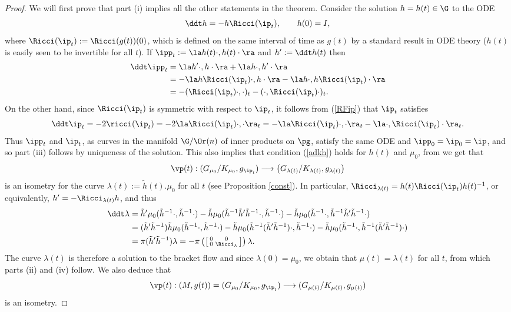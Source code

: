\documentclass[11pt]{amsart}
\theoremstyle{plain}
\theoremstyle{definition}
\theoremstyle{remark}
\begin{document}
\begin{proof}
We will first prove that part (i) implies all the other statements in the theorem.  Consider the solution $h=h(t)\in\G$ to the ODE
$$
\ddt h=-h\Ricci(\ip_t),\qquad h(0)=I,
$$
where $\Ricci(\ip_t):=\Ricci(g(t))(0)$, which is defined on the same interval of time as $g(t)$ by a standard result in ODE theory ($h(t)$ is easily seen to be invertible for all $t$).  If $\ipp_t:=\la h(t)\cdot,h(t)\cdot\ra$ and $h':=\ddt h(t)$ then
\begin{align}
\ddt\ipp_t &= \la h'\cdot,h\cdot\ra+\la h\cdot,h'\cdot\ra \notag\\
&= -\la h\Ricci(\ip_t)\cdot,h\cdot\ra -\la h\cdot,h\Ricci(\ip_t)\cdot\ra \label{ddtip}\\
&= -(\Ricci(\ip_t)\cdot,\cdot)_t -(\cdot,\Ricci(\ip_t)\cdot)_t. \notag
\end{align}
On the other hand, since $\Ricci(\ip_t)$ is symmetric with respect to $\ip_t$, it follows from (\ref{RFip}) that $\ip_t$ satisfies
$$
\ddt\ip_t=-2\ricci(\ip_t)=-2\la\Ricci(\ip_t)\cdot,\cdot\ra_t= -\la\Ricci(\ip_t)\cdot,\cdot\ra_t-\la\cdot,\Ricci(\ip_t)\cdot\ra_t.
$$
Thus $\ipp_t$ and $\ip_t$, as curves in the manifold $\G/\Or(n)$ of inner products on $\pg$, satisfy the same ODE and $\ipp_0=\ip_0=\ip$, and so part (iii) follows by uniqueness of the solution.  This also implies that condition (\ref{adkh}) holds for $h(t)$ and $\mu_0$, from we get that
$$
\vp(t):(G_{\mu_0}/K_{\mu_0},g_{\ip_t})\longrightarrow \left(G_{\lambda(t)}/K_{\lambda(t)},g_{\lambda(t)}\right)
$$
is an isometry for the curve $\lambda(t):=\tilde{h}(t).\mu_0$ for all $t$ (see Proposition \ref{const}).  In particular,  $\Ricci_{\lambda(t)}=h(t)\Ricci(\ip_t)h(t)^{-1}$, or equivalently, $h'=-\Ricci_{\lambda(t)}h$, and thus
\begin{align}
\ddt\lambda &= \tilde{h}'\mu_0(\tilde{h}^{-1}\cdot,\tilde{h}^{-1}\cdot) -\tilde{h}\mu_0(\tilde{h}^{-1}\tilde{h}'\tilde{h}^{-1}\cdot,\tilde{h}^{-1}\cdot) -\tilde{h}\mu_0(\tilde{h}^{-1}\cdot,\tilde{h}^{-1}\tilde{h}'\tilde{h}^{-1}\cdot) \notag\\
&= (\tilde{h}'\tilde{h}^{-1})\tilde{h}\mu_0(\tilde{h}^{-1}\cdot,\tilde{h}^{-1}\cdot)-\tilde{h}\mu_0(\tilde{h}^{-1}(\tilde{h}'\tilde{h}^{-1})\cdot,\tilde{h}^{-1}\cdot) -\tilde{h}\mu_0(\tilde{h}^{-1}\cdot,\tilde{h}^{-1}(\tilde{h}'\tilde{h}^{-1})\cdot) \label{ddtmu}\\
&= \pi(\tilde{h}'\tilde{h}^{-1})\lambda= -\pi\left(\left[\begin{smallmatrix} 0&0\\ 0&\Ricci_{\lambda} \notag
\end{smallmatrix}\right]\right)\lambda.
\end{align}
The curve $\lambda(t)$ is therefore a solution to the bracket flow and since $\lambda(0)=\mu_0$, we obtain that $\mu(t)=\lambda(t)$ for all $t$, from which parts (ii) and (iv) follow.  We also deduce that
$$
\vp(t):(M,g(t))=(G_{\mu_0}/K_{\mu_0},g_{\ip_t})\longrightarrow (G_{\mu(t)}/K_{\mu(t)},g_{\mu(t)})
$$
is an isometry.


\end{proof}
\end{document}
